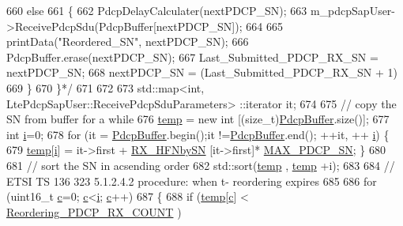 \begin{DoxyCode}
{{660 \textcolor{comment}{    else}
661 \textcolor{comment}{    \{}
662 \textcolor{comment}{      PdcpDelayCalculater(nextPDCP\_SN);}
663 \textcolor{comment}{      m\_pdcpSapUser->ReceivePdcpSdu(PdcpBuffer[nextPDCP\_SN]);}
664 \textcolor{comment}{}
665 \textcolor{comment}{      printData("Reordered\_SN", nextPDCP\_SN);}
666 \textcolor{comment}{      PdcpBuffer.erase(nextPDCP\_SN);}
667 \textcolor{comment}{      Last\_Submitted\_PDCP\_RX\_SN = nextPDCP\_SN;}
668 \textcolor{comment}{      nextPDCP\_SN = (Last\_Submitted\_PDCP\_RX\_SN + 1)%
669 \textcolor{comment}{    \}}
670 \textcolor{comment}{  \}*/}
671 
672 
673   std::map<int, LtePdcpSapUser::ReceivePdcpSduParameters> ::iterator it;
674 
675   \textcolor{comment}{// copy the SN from buffer for a while}
676   \hyperlink{classns3_1_1McUePdcp_ac36d25965be4d2fedf504d1ef93dd696}{temp} = \textcolor{keyword}{new} \textcolor{keywordtype}{int} [(size\_t)\hyperlink{classns3_1_1McUePdcp_aaca29474fb58d037d727e503c44490b5}{PdcpBuffer}.size()];
677   \textcolor{keywordtype}{int} \hyperlink{bernuolliDistribution_8m_a6f6ccfcf58b31cb6412107d9d5281426}{i}=0;
678   \textcolor{keywordflow}{for} (it = \hyperlink{classns3_1_1McUePdcp_aaca29474fb58d037d727e503c44490b5}{PdcpBuffer}.begin();it !=\hyperlink{classns3_1_1McUePdcp_aaca29474fb58d037d727e503c44490b5}{PdcpBuffer}.end(); ++it, ++
      \hyperlink{bernuolliDistribution_8m_a6f6ccfcf58b31cb6412107d9d5281426}{i}) \{
679           \hyperlink{classns3_1_1McUePdcp_ac36d25965be4d2fedf504d1ef93dd696}{temp}[\hyperlink{bernuolliDistribution_8m_a6f6ccfcf58b31cb6412107d9d5281426}{i}] = it->first + \hyperlink{classns3_1_1McUePdcp_aeb903cf6e9c21639ec4c447cc63f91c3}{RX\_HFNbySN} [it->first]*
      \hyperlink{classns3_1_1McUePdcp_a0b032c1d8d1447fa09d67cb1e660d413}{MAX\_PDCP\_SN};  \}
680 
681   \textcolor{comment}{// sort the SN in acsending order}
682   std::sort(\hyperlink{classns3_1_1McUePdcp_ac36d25965be4d2fedf504d1ef93dd696}{temp} , \hyperlink{classns3_1_1McUePdcp_ac36d25965be4d2fedf504d1ef93dd696}{temp} +i);
683 
684 \textcolor{comment}{// ETSI TS 136 323  5.1.2.4.2 procedure: when t- reordering expires}
685 
686   \textcolor{keywordflow}{for} (uint16\_t \hyperlink{lte_2model_2fading-traces_2fading__trace__generator_8m_ae0323a9039add2978bf5b49550572c7c}{c}=0; \hyperlink{lte_2model_2fading-traces_2fading__trace__generator_8m_ae0323a9039add2978bf5b49550572c7c}{c}<\hyperlink{bernuolliDistribution_8m_a6f6ccfcf58b31cb6412107d9d5281426}{i}; \hyperlink{lte_2model_2fading-traces_2fading__trace__generator_8m_ae0323a9039add2978bf5b49550572c7c}{c}++)
687   \{
688     \textcolor{keywordflow}{if} (\hyperlink{classns3_1_1McUePdcp_ac36d25965be4d2fedf504d1ef93dd696}{temp}[\hyperlink{lte_2model_2fading-traces_2fading__trace__generator_8m_ae0323a9039add2978bf5b49550572c7c}{c}] < \hyperlink{classns3_1_1McUePdcp_a3afa49adcb23a91496bfe00575cf0c53}{Reordering\_PDCP\_RX\_COUNT} )
}}}
\end{DoxyCode}
